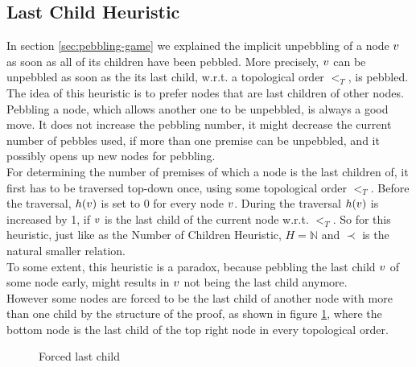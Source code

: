 \documentclass{llncs}
\begin{document}
\subsection{Last Child Heuristic}
\label{sec:lastchild}
In section \ref{sec:pebbling-game} we explained the implicit unpebbling of a node $v$ as soon as all of its children have been pebbled.
More precisely, $v$ can be unpebbled as soon as the its last child, w.r.t. a topological order $<_T$, is pebbled. 
The idea of this heuristic is to prefer nodes that are last children of other nodes.\\
Pebbling a node, which allows another one to be unpebbled, is always a good move. 
It does not increase the pebbling number, it might decrease the current number of pebbles used, if more than one premise can be unpebbled, and it possibly opens up new nodes for pebbling.\\
For determining the number of premises of which a node is the last children of, it first has to be traversed top-down once, using some topological order $<_T$.
Before the traversal, $h(v)$ is set to 0 for every node $v$. During the traversal $h(v)$ is increased by 1, if $v$ is the last child of the current node w.r.t. $<_T$.
So for this heuristic, just like as the Number of Children Heuristic, $H = \mathbb{N}$ and $\prec$ is the natural smaller relation.\\
To some extent, this heuristic is a paradox, because pebbling the last child $v$ of some node early, might results in $v$ not being the last child anymore.\\
However some nodes are forced to be the last child of another node with more than one child by the structure of the proof, as shown in figure \ref{fig:forcedLC}, where the bottom node is the last child of the top right node in every topological order.

\begin{figure}[h]
	\caption{Forced last child}
	\label{fig:forcedLC}
\end{figure}
\end{document}
